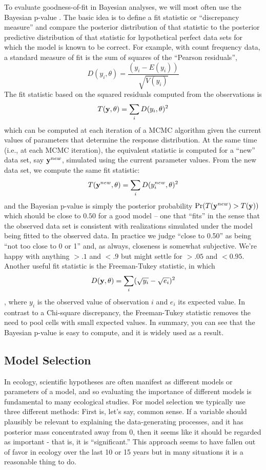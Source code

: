To evaluate goodness-of-fit in Bayesian analyses, we will most often
use the Bayesian p-value \citep{gelman_etal:1996}.  The basic idea is to define
a fit statistic or ``discrepancy measure'' and compare the posterior distribution of that
statistic to the posterior predictive distribution of that statistic
for hypothetical perfect data sets for which the model is known to be correct. For
example, with count frequency data, a standard measure of fit is the
sum of squares of the ``Pearson residuals'',
\[
D(y_i,\theta) = \frac{(y_i - E(y_i))}{\sqrt{V( y_{i} )}}
\]
The fit statistic based on the squared residuals computed from the
observations is 
\[
T({\bf y}, \theta) = \sum_{i} D(y_{i},\theta)^{2}
\]
which can be computed at each iteration of a MCMC algorithm given the
current values of parameters that determine the
 response distribution.  At the same time (i.e., at each MCMC
 iteration),
the equivalent statistic is computed for a
``new'' data set, say ${\bf y}^{new}$, 
simulated using the current parameter values. From the new data set,
we compute the same fit statistic:
\[
T({\bf y}^{new}, \theta) = \sum_{i} D(y_{i}^{new},\theta)^{2}
\]
and 
the
Bayesian p-value is simply the posterior probability $\Pr(T({\bf
  y}^{new})  >  T({\bf y}))$
 which should be close to $0.50$ for a good model -- one that
 ``fits'' in the sense that the observed data set is
 consistent with realizations simulated under the model being fitted
 to the observed data. In practice
we judge ``close to 0.50'' as being ``not too close to 0 or 1'' and,
as always, closeness is somewhat subjective. We're happy with anything
$>.1$ and $<.9$ but might settle for $>.05$ and $<0.95$. 
Another useful fit statistic is the Freeman-Tukey
statistic, in which
\[
D({\bf y},\theta) = \sum_{i} ( \sqrt{y_{i}} - \sqrt{e_{i}} )^2
\]
\citep{brooks_etal:2000}, where $y_{i}$ is the observed value of
observation $i$ and $e_{i}$ its expected value. In contrast to a
Chi-square discrepancy, the Freeman-Tukey statistic removes the need
to pool cells with small expected values.
In summary, you can see that 
the Bayesian p-value is easy to compute,
and it is widely used as a result.


\subsection{Model Selection }

In ecology, scientific hypotheses are often manifest as different models or parameters
 of a model, and so
evaluating the importance of different models is fundamental 
to many ecological studies.
For model selection we typically use three different methods: First
is, let's say, common sense. If a variable should plausibly be
relevant to explaining the data-generating processes, and it has 
 posterior mass
concentrated away from 0, then it seems like it should be regarded as
important - that is, it is ``significant.''  This approach seems to
have fallen out of favor in ecology over the last 10 or
15 years but in many situations it is a reasonable thing to do.

